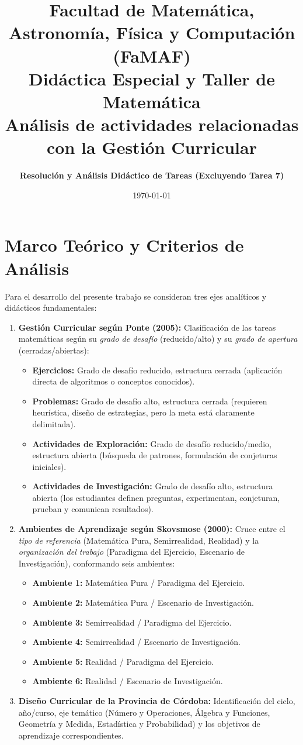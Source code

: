 \documentclass[11pt,a4paper]{article}
\title{\textbf{Facultad de Matemática, Astronomía, Física y Computación (FaMAF)}\\\large Didáctica Especial y Taller de Matemática\\\vspace{0.3cm}\normalsize Análisis de actividades relacionadas con la Gestión Curricular}
\author{\textbf{Resolución y Análisis Didáctico de Tareas (Excluyendo Tarea 7)}}
\date{\today}
\begin{document}
\maketitle

\section{Marco Teórico y Criterios de Análisis}

Para el desarrollo del presente trabajo se consideran tres ejes analíticos y didácticos fundamentales:
\begin{enumerate}
    \item \textbf{Gestión Curricular según Ponte (2005):} Clasificación de las tareas matemáticas según su \textit{grado de desafío} (reducido/alto) y su \textit{grado de apertura} (cerradas/abiertas):
    \begin{itemize}
        \item \textbf{Ejercicios:} Grado de desafío reducido, estructura cerrada (aplicación directa de algoritmos o conceptos conocidos).
        \item \textbf{Problemas:} Grado de desafío alto, estructura cerrada (requieren heurística, diseño de estrategias, pero la meta está claramente delimitada).
        \item \textbf{Actividades de Exploración:} Grado de desafío reducido/medio, estructura abierta (búsqueda de patrones, formulación de conjeturas iniciales).
        \item \textbf{Actividades de Investigación:} Grado de desafío alto, estructura abierta (los estudiantes definen preguntas, experimentan, conjeturan, prueban y comunican resultados).
    \end{itemize}
    \item \textbf{Ambientes de Aprendizaje según Skovsmose (2000):} Cruce entre el \textit{tipo de referencia} (Matemática Pura, Semirrealidad, Realidad) y la \textit{organización del trabajo} (Paradigma del Ejercicio, Escenario de Investigación), conformando seis ambientes:
    \begin{itemize}
        \item \textbf{Ambiente 1:} Matemática Pura / Paradigma del Ejercicio.
        \item \textbf{Ambiente 2:} Matemática Pura / Escenario de Investigación.
        \item \textbf{Ambiente 3:} Semirrealidad / Paradigma del Ejercicio.
        \item \textbf{Ambiente 4:} Semirrealidad / Escenario de Investigación.
        \item \textbf{Ambiente 5:} Realidad / Paradigma del Ejercicio.
        \item \textbf{Ambiente 6:} Realidad / Escenario de Investigación.
    \end{itemize}
    \item \textbf{Diseño Curricular de la Provincia de Córdoba:} Identificación del ciclo, año/curso, eje temático (Número y Operaciones, Álgebra y Funciones, Geometría y Medida, Estadística y Probabilidad) y los objetivos de aprendizaje correspondientes.
\end{enumerate}
\end{document}
